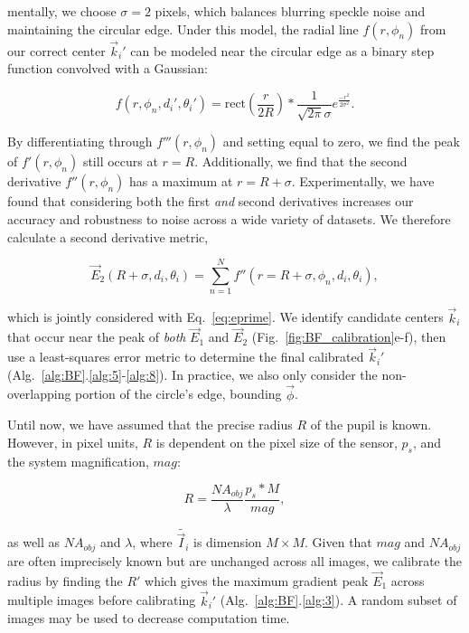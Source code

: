 mentally, we choose $\sigma = 2$ pixels, which balances blurring speckle noise and maintaining the circular edge. Under this model, the radial line $f(r,\phi_n)$ from our correct center $\vec{k}_i'$ can be modeled near the circular edge as a binary step function convolved with a Gaussian:

\begin{equation}
f(r,\phi_n,d_i',\theta_i') = \text{rect}(\frac{r}{2R}) * \frac{1}{\sqrt{2\pi}\sigma}e^{\frac{-r^2}{2\sigma^2}}.
\label{eq:spoke}
\end{equation}


\noindent By differentiating through $f'''(r,\phi_n)$ and setting equal to zero, we find the peak of $f'(r,\phi_n)$ still occurs at $r=R$. Additionally, we find that the second derivative $f''(r,\phi_n)$ has a maximum at $r=R+\sigma$. Experimentally, we have found that considering both the first \textit{and} second derivatives increases our accuracy and robustness to noise across a wide variety of datasets. We therefore calculate a second derivative metric,

\begin{equation}
\vec{E}_2(R+\sigma,d_i,\theta_i)=\sum_{n=1}^{N} f''(r = R+\sigma,\phi_n,d_i,\theta_i),
\label{eq:edoubleprime}
\end{equation}

\noindent which is jointly considered with Eq.~\ref{eq:eprime}. We identify candidate centers $\vec{k}_i$ that occur near the peak of \textit{both} $\vec{E}_1$ and $\vec{E}_2$ (Fig.~\ref{fig:BF_calibration}e-f), then use a least-squares error metric to determine the final calibrated $\vec{k}_i'$ (Alg.~\ref{alg:BF}.\ref{alg:5}-\ref{alg:8}). In practice, we also only consider the non-overlapping portion of the circle's edge, bounding $\vec{\phi}$.

Until now, we have assumed that the precise radius $R$ of the pupil is known. However, in pixel units, $R$ is dependent on the pixel size of the sensor, $p_s$, and the system magnification, $mag$:

\begin{equation}
R = \frac{NA_{obj}}{\lambda} \frac{p_s*M}{mag},
\end{equation}

\noindent as well as $NA_{obj}$ and $\lambda$, where $\tilde{\vec{I}_i}$ is dimension $M\times M$. Given that $mag$ and $NA_{obj}$ are often imprecisely known but are unchanged across all images, we calibrate the radius by finding the $R'$ which gives the maximum gradient peak $\vec{E}_1$ across multiple images before calibrating $\vec{k}_i'$ (Alg.~\ref{alg:BF}.\ref{alg:3}). A random subset of images may be used to decrease computation time.

